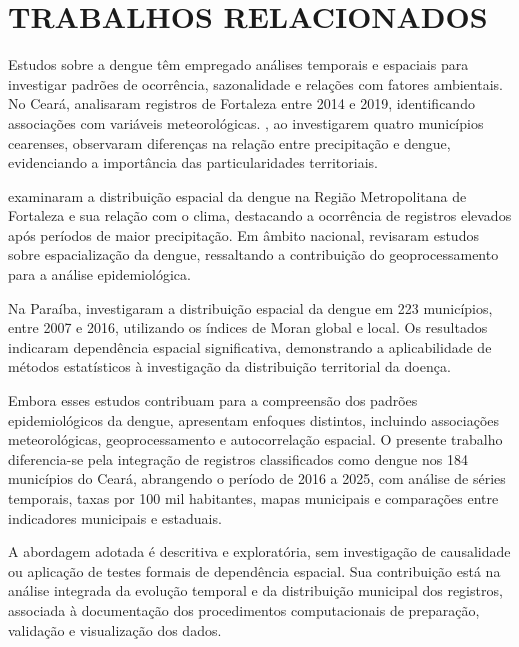 
\begingroup
\let\clearpage\relax
\chapter{TRABALHOS RELACIONADOS}
\label{sec:trabalhos-relacionados}
\endgroup

Estudos sobre a dengue têm empregado análises temporais e espaciais para investigar padrões de ocorrência, sazonalidade e relações com fatores ambientais. No Ceará,  analisaram registros de Fortaleza entre 2014 e 2019, identificando associações com variáveis meteorológicas. , ao investigarem quatro municípios cearenses, observaram diferenças na relação entre precipitação e dengue, evidenciando a importância das particularidades territoriais.

 examinaram a distribuição espacial da dengue na Região Metropolitana de Fortaleza e sua relação com o clima, destacando a ocorrência de registros elevados após períodos de maior precipitação. Em âmbito nacional,  revisaram estudos sobre espacialização da dengue, ressaltando a contribuição do geoprocessamento para a análise epidemiológica.

Na Paraíba,  investigaram a distribuição espacial da dengue em 223 municípios, entre 2007 e 2016, utilizando os índices de Moran global e local. Os resultados indicaram dependência espacial significativa, demonstrando a aplicabilidade de métodos estatísticos à investigação da distribuição territorial da doença.

Embora esses estudos contribuam para a compreensão dos padrões epidemiológicos da dengue, apresentam enfoques distintos, incluindo associações meteorológicas, geoprocessamento e autocorrelação espacial. O presente trabalho diferencia-se pela integração de registros classificados como dengue nos 184 municípios do Ceará, abrangendo o período de 2016 a 2025, com análise de séries temporais, taxas por 100 mil habitantes, mapas municipais e comparações entre indicadores municipais e estaduais.

A abordagem adotada é descritiva e exploratória, sem investigação de causalidade ou aplicação de testes formais de dependência espacial. Sua contribuição está na análise integrada da evolução temporal e da distribuição municipal dos registros, associada à documentação dos procedimentos computacionais de preparação, validação e visualização dos dados.
